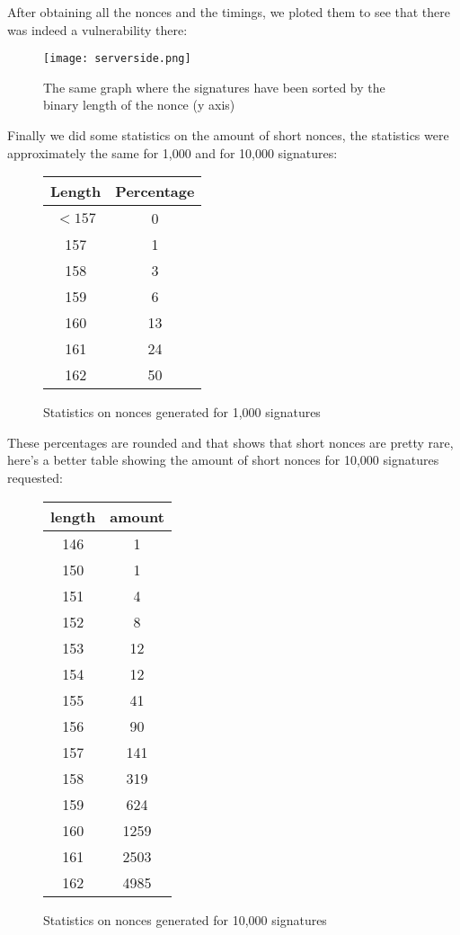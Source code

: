 \documentclass[a4paper,11pt]{article}
\begin{document}
After obtaining all the nonces and the timings, we ploted them to see that there was indeed a vulnerability there:

\begin{figure}[H]
\texttt{[image: serverside.png]}
\caption{The same graph where the signatures have been sorted by the binary length of the nonce (y axis)}
\end{figure}

Finally we did some statistics on the amount of short nonces, the statistics were approximately the same for 1,000 and for 10,000 signatures:

\begin{figure}[H]
\begin{center} 
\begin{tabular}{@{} *2c @{}}
\toprule
 Length & Percentage \\ 
\midrule
$<157$&     0          \\
157&     1          \\
158&     3          \\
159&     6          \\
160&       13         \\
161&     24         \\
162&        50
\bottomrule
\end{tabular}
\end{center} 
\caption{Statistics on nonces generated for 1,000 signatures}
\end{figure}
These percentages are rounded and that shows that short nonces are pretty rare, here's a better table showing the amount of short nonces for 10,000 signatures requested:

\begin{figure}[H]
\begin{center} 
\begin{tabular}{@{} *2c @{}}
\toprule
length & amount \\ 
\midrule
146 &    1      \\
150&     1       \\
151 &    4       \\
152  &   8       \\
153   &  12      \\
154  &   12      \\
155 &    41      \\
156&     90      \\
157 &    141     \\
158 &    319     \\
159  &   624     \\
160   &  1259    \\
161    & 2503   \\ 
162     &4985    
\bottomrule
\end{tabular}
\end{center} 
\caption{Statistics on nonces generated for 10,000 signatures}
\end{figure}
\end{document}

